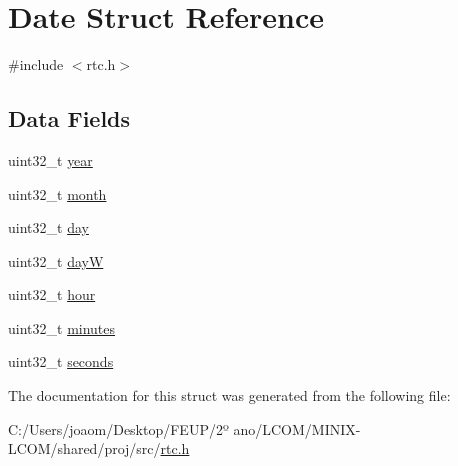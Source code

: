 \hypertarget{struct_date}{}\section{Date Struct Reference}
\label{struct_date}


{\ttfamily \#include $<$rtc.\+h$>$}

\subsection*{Data Fields}
\begin{DoxyCompactItemize}
\item 
uint32\+\_\+t \mbox{\hyperlink{group__rtc_gaac3a162d2f192fe2360aba534eac7198}{year}}
\item 
uint32\+\_\+t \mbox{\hyperlink{group__rtc_ga55a5fa57878363d803833666ddf3c16f}{month}}
\item 
uint32\+\_\+t \mbox{\hyperlink{group__rtc_ga897ed87b95b7a37afeeb935ca0b2366b}{day}}
\item 
uint32\+\_\+t \mbox{\hyperlink{group__rtc_gaa24f12f79f7553236083be08521c546e}{dayW}}
\item 
uint32\+\_\+t \mbox{\hyperlink{group__rtc_ga26d5bae76d83086900174b266fd2cd82}{hour}}
\item 
uint32\+\_\+t \mbox{\hyperlink{group__rtc_ga2dcb690348d97b756f4d165c80c9af7d}{minutes}}
\item 
uint32\+\_\+t \mbox{\hyperlink{group__rtc_ga6d5694839ec935781627e5c52de21fda}{seconds}}
\end{DoxyCompactItemize}


The documentation for this struct was generated from the following file\+:\begin{DoxyCompactItemize}
\item 
C\+:/\+Users/joaom/\+Desktop/\+F\+E\+U\+P/2º ano/\+L\+C\+O\+M/\+M\+I\+N\+I\+X-\/\+L\+C\+O\+M/shared/proj/src/\mbox{\hyperlink{rtc_8h}{rtc.\+h}}\end{DoxyCompactItemize}
